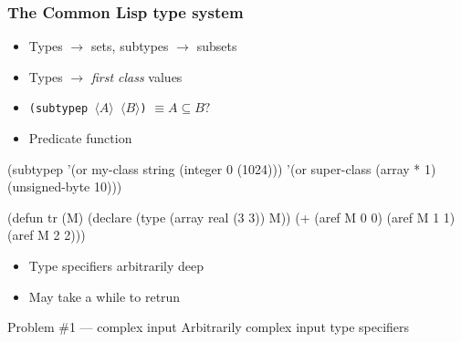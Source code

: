 \documentclass[aspectratio=169]{beamer}
\renewcommand\code[1]{\texttt{#1}}
\newcommand\rarr{\ensuremath{\rightarrow}}
\newcommand\plholder[1]{\ensuremath{\langle {#1} \rangle}}
\begin{document}
\begin{frame}[fragile]
  \frametitle{The Common Lisp type system}
  \begin{itemize}
  \item Types \rarr{} sets, subtypes \rarr{} subsets
  \item Types \rarr{} \emph{first class} values
  \end{itemize}

  \begin{itemize}
  \item<3-> \code{(subtypep \plholder A \plholder B)} $\equiv A \subseteq B?$
  \item<3-> Predicate function
  \end{itemize}

  \pause
  \medskip

  \begin{overprint}
\begin{clcode}
(subtypep '(or my-class string (integer 0 (1024)))
          '(or super-class
               (array * 1)
               (unsigned-byte 10)))
\end{clcode}

\begin{clcode}
(defun tr (M)
  (declare (type (array real (3 3)) M))
  (+ (aref M 0 0)
     (aref M 1 1)
     (aref M 2 2)))
\end{clcode}
  \end{overprint}

  \begin{popup}{.75}
    \begin{macosbox}{}
      \begin{itemize}
      \item Type specifiers arbitrarily deep
      \item May take a while to retrun
      \end{itemize}

      \begin{alertblock}{Problem \#1 --- complex input}
        Arbitrarily complex input type specifiers
      \end{alertblock}
    \end{macosbox}
  \end{popup}
\end{frame}
\end{document}
